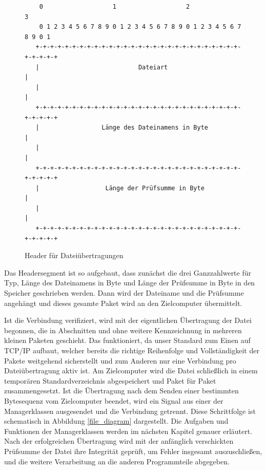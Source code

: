 \begin{figure}[h]
\begin{lstlisting}
	0                   1                   2                   3
    0 1 2 3 4 5 6 7 8 9 0 1 2 3 4 5 6 7 8 9 0 1 2 3 4 5 6 7 8 9 0 1
   +-+-+-+-+-+-+-+-+-+-+-+-+-+-+-+-+-+-+-+-+-+-+-+-+-+-+-+-+-+-+-+-+
   |                           Dateiart                            |
   |                                                               |
   +-+-+-+-+-+-+-+-+-+-+-+-+-+-+-+-+-+-+-+-+-+-+-+-+-+-+-+-+-+-+-+-+
   |                 Länge des Dateinamens in Byte                 |
   |                                                               |
   +-+-+-+-+-+-+-+-+-+-+-+-+-+-+-+-+-+-+-+-+-+-+-+-+-+-+-+-+-+-+-+-+
   |                  Länge der Prüfsumme in Byte                  |
   |                                                               |
   +-+-+-+-+-+-+-+-+-+-+-+-+-+-+-+-+-+-+-+-+-+-+-+-+-+-+-+-+-+-+-+-+
\end{lstlisting}
\caption{Header für Dateiübertragungen}
\label{Datei_Header}
\end{figure}

Das Headersegment ist so aufgebaut, dass zunächst die drei Ganzzahlwerte für Typ, Länge des Dateinamens in Byte und Länge der Prüfsumme in Byte in den Speicher geschrieben werden. 
Dann wird der Dateiname und die Prüfsumme angehängt und dieses gesamte Paket wird an den Zielcomputer übermittelt.\par
Ist die Verbindung verifiziert, wird mit der eigentlichen Übertragung der Datei begonnen, die in Abschnitten und ohne weitere Kennzeichnung in mehreren kleinen Paketen geschieht.
Das funktioniert, da unser Standard zum Einen auf TCP/IP aufbaut, welcher bereits die richtige Reihenfolge und Vollständigkeit der Pakete weitgehend sicherstellt und zum Anderen nur eine Verbindung pro Dateiübertragung aktiv ist.
Am Zielcomputer wird die Datei schließlich in einem temporären Standardverzeichnis abgespeichert und Paket für Paket zusammengesetzt.
Ist die Übertragung nach dem Senden einer bestimmten Bytesequenz vom Zielcomputer beendet, wird ein Signal aus einer der Managerklassen ausgesendet und die Verbindung getrennt.
Diese Schrittfolge ist schematisch in Abbildung \ref{file_diagram} dargestellt.
Die Aufgaben und Funktionen der Managerklassen werden im nächsten Kapitel genauer erläutert.
Nach der erfolgreichen Übertragung wird mit der anfänglich verschickten Prüfsumme der Datei ihre Integrität geprüft, um Fehler insgesamt auszuschließen, und die weitere Verarbeitung an die anderen Programmteile abgegeben.\\\\

